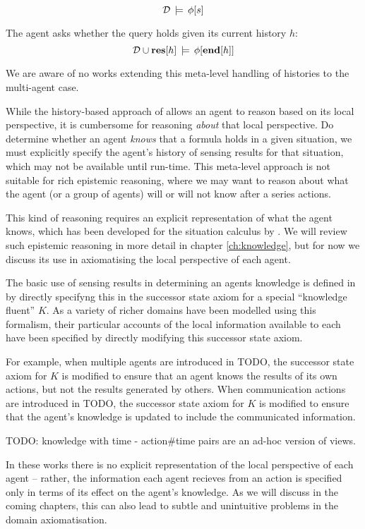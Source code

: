 \[
\mathcal{D}\,\models\,\phi[s]\]


The agent asks whether the query holds given its current history $h$:\[
\mathcal{D}\cup\mathbf{res}[h]\,\models\,\phi[\mathbf{end}[h]]\]


We are aware of no works extending this meta-level handling of histories
to the multi-agent case.

While the history-based approach of \citep{giacomo99indigolog} allows
an agent to reason based on its local perspective, it is cumbersome
for reasoning \emph{about} that local perspective. Do determine whether
an agent \emph{knows} that a formula holds in a given situation, we
must explicitly specify the agent's history of sensing results for
that situation, which may not be available until run-time. This meta-level
approach is not suitable for rich epistemic reasoning, where we may
want to reason about what the agent (or a group of agents) will or
will not know after a series actions.

This kind of reasoning requires an explicit representation of what
the agent knows, which has been developed for the situation calculus
by \citet{scherl03sc_knowledge}. We will review such epistemic reasoning
in more detail in chapter \ref{ch:knowledge}, but for now we discuss
its use in axiomatising the local perspective of each agent.

The basic use of sensing results in determining an agents knowledge
is defined in \citep{scherl03sc_knowledge} by directly specifyng
this in the successor state axiom for a special {}``knowledge fluent''
$K$. As a variety of richer domains have been modelled using this
formalism, their particular accounts of the local information available
to each have been specified by directly modifying this successor state
axiom.

For example, when multiple agents are introduced in TODO, the successor
state axiom for $K$ is modified to ensure that an agent knows the
results of its own actions, but not the results generated by others.
When communication actions are introduced in TODO, the successor state
axiom for $K$ is modified to ensure that the agent's knowledge is
updated to include the communicated information.

TODO: knowledge with time - action\#time pairs are an ad-hoc version
of views.

In these works there is no explicit representation of the local perspective
of each agent -- rather, the information each agent recieves from
an action is specified only in terms of its effect on the agent's
knowledge. As we will discuss in the coming chapters, this can also
lead to subtle and unintuitive problems in the domain axiomatisation.

